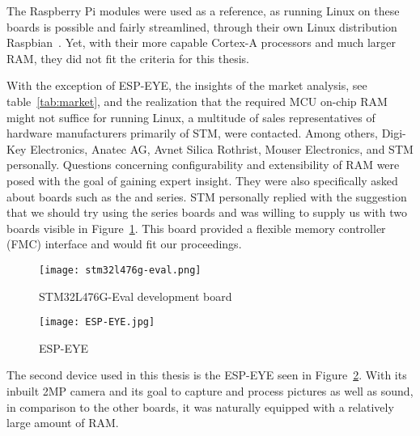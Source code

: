 The Raspberry Pi modules were used as a reference, as running Linux on these boards is possible and fairly streamlined, through their own Linux distribution Raspbian~\cite{raspberrypios}. Yet, with their more capable Cortex-A processors and much larger RAM, they did not fit the criteria for this thesis.

With the exception of ESP-EYE, the insights of the market analysis, see table~\ref{tab:market}, and the realization that the required MCU on-chip RAM might not suffice for running Linux, a multitude of sales representatives of hardware manufacturers primarily of STM, were contacted. Among others, Digi-Key Electronics, Anatec AG, Avnet Silica Rothrist, Mouser Electronics, and STM personally. Questions concerning configurability and extensibility of RAM were posed with the goal of gaining expert insight. They were also specifically asked about boards such as the  and  series. STM personally replied with the suggestion that we should try using the  series boards and was willing to supply us with two boards visible in Figure~\ref{stm32l}. This board provided a flexible memory controller (FMC) interface and would fit our proceedings.

\begin{figure}
\centering
\texttt{[image: stm32l476g-eval.png]}
\caption{STM32L476G-Eval development board~\cite{stm32Lpic}}
\label{stm32l}
\end{figure}

\begin{figure}
\centering
\texttt{[image: ESP-EYE.jpg]}
\caption{ESP-EYE}
\label{esp-eye}
\end{figure}

The second device used in this thesis is the ESP-EYE seen in Figure~\ref{esp-eye}. With its inbuilt 2MP camera and its goal to capture and process pictures as well as sound, in comparison to the other boards, it was naturally equipped with a relatively large amount of RAM.


